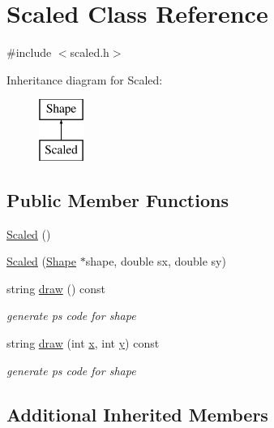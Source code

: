 \hypertarget{class_scaled}{}\section{Scaled Class Reference}
\label{class_scaled}


{\ttfamily \#include $<$scaled.\+h$>$}

Inheritance diagram for Scaled\+:\begin{figure}[H]
\begin{center}
\leavevmode
\includegraphics[height=2.000000cm]{class_scaled}
\end{center}
\end{figure}
\subsection*{Public Member Functions}
\begin{DoxyCompactItemize}
\item 
\hyperlink{class_scaled_a77df7ef81f1c3c267cf093c215fe67a8}{Scaled} ()
\item 
\hyperlink{class_scaled_aa0379fdc7d7d44b4735644447386c5c4}{Scaled} (\hyperlink{class_shape}{Shape} $\ast$shape, double sx, double sy)
\item 
string \hyperlink{class_scaled_ad86e14b9c9e880d31b7581134f03e5dc}{draw} () const 
\begin{DoxyCompactList}\small\item\em generate ps code for shape \end{DoxyCompactList}\item 
string \hyperlink{class_scaled_a643010334ff7c4d5cffb98e735a94f8e}{draw} (int \hyperlink{class_shape_a41e403e73d2949f1a6adfba6032c41ec}{x}, int \hyperlink{class_shape_ac757f715cc5b5681f2c691663ac06f0a}{y}) const 
\begin{DoxyCompactList}\small\item\em generate ps code for shape \end{DoxyCompactList}\end{DoxyCompactItemize}
\subsection*{Additional Inherited Members}


